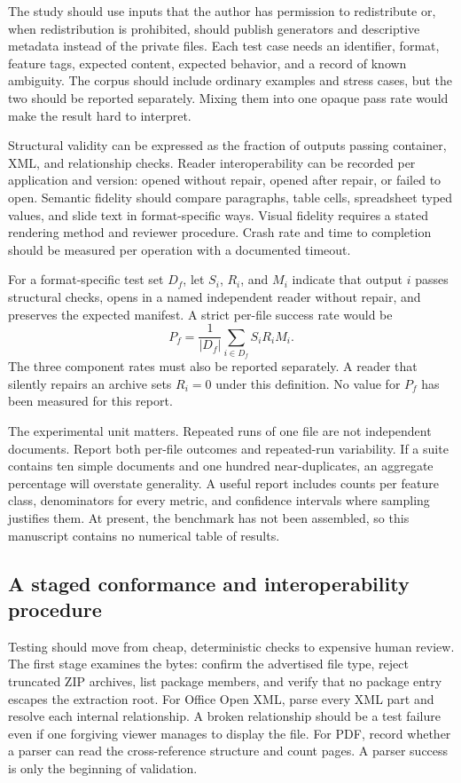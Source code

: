 \documentclass[10pt,letterpaper]{article}
\begin{document}
The study should use inputs that the author has permission to redistribute or, when redistribution is prohibited, should publish generators and descriptive metadata instead of the private files. Each test case needs an identifier, format, feature tags, expected content, expected behavior, and a record of known ambiguity. The corpus should include ordinary examples and stress cases, but the two should be reported separately. Mixing them into one opaque pass rate would make the result hard to interpret.

Structural validity can be expressed as the fraction of outputs passing container, XML, and relationship checks. Reader interoperability can be recorded per application and version: opened without repair, opened after repair, or failed to open. Semantic fidelity should compare paragraphs, table cells, spreadsheet typed values, and slide text in format-specific ways. Visual fidelity requires a stated rendering method and reviewer procedure. Crash rate and time to completion should be measured per operation with a documented timeout.


For a format-specific test set $D_f$, let $S_i$, $R_i$, and $M_i$ indicate
that output $i$ passes structural checks, opens in a named independent reader
without repair, and preserves the expected manifest. A strict per-file
success rate would be
\begin{equation}
P_f=\frac{1}{|D_f|}\sum_{i\in D_f}S_iR_iM_i.
\end{equation}
The three component rates must also be reported separately. A reader that
silently repairs an archive sets $R_i=0$ under this definition. No value
for $P_f$ has been measured for this report.


The experimental unit matters. Repeated runs of one file are not independent documents. Report both per-file outcomes and repeated-run variability. If a suite contains ten simple documents and one hundred near-duplicates, an aggregate percentage will overstate generality. A useful report includes counts per feature class, denominators for every metric, and confidence intervals where sampling justifies them. At present, the benchmark has not been assembled, so this manuscript contains no numerical table of results.

\subsection{A staged conformance and interoperability procedure}

Testing should move from cheap, deterministic checks to expensive human review. The first stage examines the bytes: confirm the advertised file type, reject truncated ZIP archives, list package members, and verify that no package entry escapes the extraction root. For Office Open XML, parse every XML part and resolve each internal relationship. A broken relationship should be a test failure even if one forgiving viewer manages to display the file. For PDF, record whether a parser can read the cross-reference structure and count pages. A parser success is only the beginning of validation.
\end{document}
